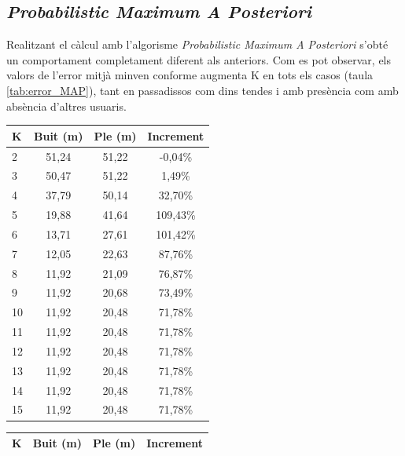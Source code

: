 \subsection{\textit{Probabilistic Maximum A Posteriori}}

Realitzant el càlcul amb l'algorisme \textit{Probabilistic Maximum A Posteriori} s'obté un comportament completament diferent als anteriors. Com es pot observar, els valors de l'error mitjà minven conforme augmenta K en tots els casos (taula \ref{tab:error_MAP}), tant en passadissos com dins tendes i amb presència com amb absència d'altres usuaris.

\begin{table}[h]
  \begin{center}
      \begin{tabular}{|l|c|c|c|}
        \hline
        \cellcolor[gray]{0.9} K & \cellcolor[gray]{0.9} Buit (m) & \cellcolor[gray]{0.9} Ple (m) & \cellcolor[gray]{0.9} Increment \\ \hline
        
        2  & 51,24 & 51,22 & -0,04\%  \\
        3  & 50,47 & 51,22 & 1,49\%   \\
        4  & 37,79 & 50,14 & 32,70\%  \\
        5  & 19,88 & 41,64 & 109,43\% \\
        6  & 13,71 & 27,61 & 101,42\% \\
        7  & 12,05 & 22,63 & 87,76\%  \\
        8  & 11,92 & 21,09 & 76,87\%  \\
        9  & 11,92 & 20,68 & 73,49\%  \\
        10 & 11,92 & 20,48 & 71,78\%  \\
        11 & 11,92 & 20,48 & 71,78\%  \\
        12 & 11,92 & 20,48 & 71,78\%  \\
        13 & 11,92 & 20,48 & 71,78\%  \\
        14 & 11,92 & 20,48 & 71,78\%  \\
        15 & 11,92 & 20,48 & 71,78\%  \\ \hline

      \end{tabular}
      
      \hspace{10pt}
      
      \begin{tabular}{|l|c|c|c|}
        \hline
        \cellcolor[gray]{0.9} K & \cellcolor[gray]{0.9} Buit (m) & \cellcolor[gray]{0.9} Ple (m) & \cellcolor[gray]{0.9} Increment \\ \hline
        

\end{tabular}
\end{center}
\end{table}
